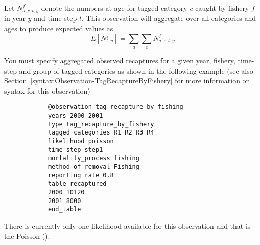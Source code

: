 Let \(N^f_{a,c,t, y}\) denote the numbers at age for tagged category \(c\) caught by fishery \(f\) in year \(y\) and time-step \(t\). This observation will aggregate over all categories and ages to produce expected values as
\[
E[N^f_{t, y}] = \sum\limits_a\sum\limits_c N^f_{a,c,t, y}
\]

You must specify aggregated observed recaptures for a given year, fishery, time-step and group of tagged categories as shown in the following example (see also Section~\ref{syntax:Observation-TagRecaptureByFishery} for more information on syntax for this observation)
{\small{\begin{verbatim}
			@observation tag_recapture_by_fishing
			years 2000 2001
			type tag_recapture_by_fishery
			tagged_categories R1 R2 R3 R4 
			likelihood poisson
			time_step step1
			mortality_process fishing
			method_of_removal Fishing
			reporting_rate 0.8
			table recaptured
			2000 10120
			2001 8000
			end_table
\end{verbatim}}}

There is currently only one likelihood available for this observation and that is the Poisson ().

